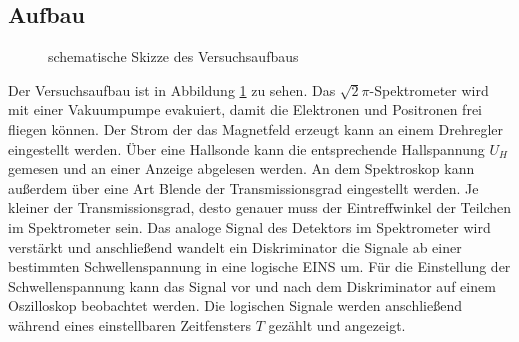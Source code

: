 \subsection{Aufbau}
\begin{figure}[h]
  \centering
  \caption{schematische Skizze des Versuchsaufbaus}
  \label{fig:aufbau}
\end{figure}

Der Versuchsaufbau ist in Abbildung \ref{fig:aufbau} zu sehen. Das $\sqrt{2}\pi$-Spektrometer wird mit einer Vakuumpumpe evakuiert, damit die Elektronen und Positronen frei fliegen können. Der Strom der das Magnetfeld erzeugt kann an einem Drehregler eingestellt werden. Über eine Hallsonde kann die entsprechende Hallspannung $U_H$ gemesen und an einer Anzeige abgelesen werden. An dem Spektroskop kann außerdem über eine Art Blende der Transmissionsgrad eingestellt werden. Je kleiner der Transmissionsgrad, desto genauer muss der Eintreffwinkel der Teilchen im Spektrometer sein. Das analoge Signal des Detektors im Spektrometer wird verstärkt und anschließend wandelt ein Diskriminator die Signale ab einer bestimmten Schwellenspannung in eine logische EINS um. Für die Einstellung der Schwellenspannung kann das Signal vor und nach dem Diskriminator auf einem Oszilloskop beobachtet werden. Die logischen Signale werden anschließend während eines einstellbaren Zeitfensters $T$ gezählt und angezeigt.

